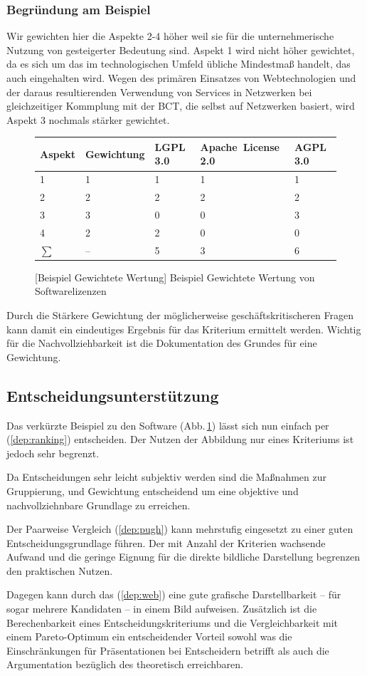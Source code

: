 \subsubsection*{Begründung am Beispiel}
Wir gewichten hier die Aspekte 2-4 höher weil sie für die unternehmerische Nutzung von gesteigerter Bedeutung sind.
Aspekt 1 wird nicht höher gewichtet, da es sich um das im technologischen Umfeld übliche Mindestmaß handelt, das auch eingehalten wird.
Wegen des primären Einsatzes von Webtechnologien und der daraus resultierenden Verwendung von Services in Netzwerken bei gleichzeitiger Kommplung mit der \gls{BCT}, die selbst auf Netzwerken basiert, wird Aspekt 3 nochmals stärker gewichtet.

\begin{figure}[!htp]
\centering
\begin{tabular}{l|llll}
Aspekt	& Gewichtung & LGPL\,3.0 	& Apache~License\,2.0 & AGPL\,3.0 \\
\hline
\hline
1 		& 1	& 1	& 1	& 1	\\
\hline
2 		& 2	& 2	& 2	& 2	\\
\hline
3 		& 3	& 0	& 0	& 3	\\
\hline
4		& 2	& 2 & 0 & 0 \\
\hline
\hline
\(\sum\)& --& 5 & 3 & 6 \\
\end{tabular}
[Beispiel Gewichtete Wertung]{\label{abb:wertung:oss2} Beispiel Gewichtete Wertung von Softwarelizenzen}
\end{figure}

Durch die Stärkere Gewichtung der möglicherweise geschäftskritischeren Fragen kann damit ein eindeutiges Ergebnis für das Kriterium ermittelt werden.
Wichtig für die Nachvollziehbarkeit ist die Dokumentation des Grundes für eine Gewichtung.

\subsection{Entscheidungsunterstützung}

Das verkürzte Beispiel zu den Software (Abb.\,\ref{abb:wertung:oss2}) lässt sich nun einfach per  (\ref{dep:ranking}) entscheiden.
Der Nutzen der Abbildung nur eines Kriteriums ist jedoch sehr begrenzt.

Da Entscheidungen sehr leicht subjektiv werden sind die Maßnahmen zur Gruppierung,  und Gewichtung entscheidend um
eine objektive und nachvollziehnbare Grundlage zu erreichen.

Der Paarweise Vergleich (\ref{dep:pugh}) kann mehrstufig eingesetzt zu einer guten Entscheidungsgrundlage führen.
Der mit Anzahl der Kriterien wachsende Aufwand und die geringe Eignung für die direkte bildliche Darstellung begrenzen den praktischen Nutzen.

Dagegen kann durch das  (\ref{dep:web}) eine gute grafische Darstellbarkeit -- für sogar mehrere Kandidaten -- in einem Bild aufweisen.
Zusätzlich ist die Berechenbarkeit eines Entscheidungskriteriums und die Vergleichbarkeit mit einem Pareto-Optimum ein entscheidender Vorteil sowohl was die Einschränkungen für Präsentationen bei Entscheidern betrifft als auch die Argumentation bezüglich des theoretisch erreichbaren.
